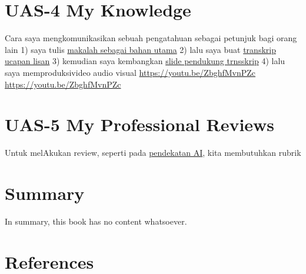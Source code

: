 \documentclass[
  letterpaper,
  DIV=11,
  numbers=noendperiod]{scrreprt}
\begin{document}

\chapter{UAS-4 My Knowledge}\label{uas-4-my-knowledge}

Cara saya mengkomunikasikan sebuah pengatahuan sebagai petunjuk bagi
orang lain 1) saya tulis
\href{Rekomendasi\%20Presentasi\%20Efektif(Contoh\%20Makalah).pdf}{makalah
sebagai bahan utama} 2) lalu saya buat
\href{Contoh\%20Transkrip\%20Presentasi.pdf}{transkrip ucapan lisan} 3)
kemudian saya kembangkan
\href{Rekomendasi\%20Presentasi\%20(Contoh\%20Slides).pdf}{slide
pendukung trnsskrip} 4) lalu saya memproduksivideo audio visual
\url{https://youtu.be/ZbghfMvnPZc} \url{https://youtu.be/ZbghfMvnPZc}


\chapter{UAS-5 My Professional
Reviews}\label{uas-5-my-professional-reviews}

Untuk melAkukan review, seperti pada
\href{../My_Personal_Reviews/Doc.5.Mengevaluasi-Esai-Berdasarkan-Rubrik.pdf}{pendekatan
AI}, kita membutuhkan rubrik


\chapter{Summary}\label{summary}

In summary, this book has no content whatsoever.


\chapter*{References}\label{references}


\label{refs}
\end{document}
